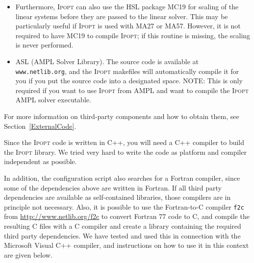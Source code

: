 \documentclass[10pt]{article}
\newcommand{\Ipopt}{\textsc{Ipopt}\xspace}
\begin{document}
\begin{itemize}
  \textbf{NOTE: The solution of the linear systems is a central
    ingredient in \Ipopt and the optimizer's performance and
    robustness depends on your choice.  The best choice depends on
    your application, and it makes sense to try different options.
    Most of the solvers also rely on efficient BLAS code (see above),
    so you should use a good BLAS library tailored to your system.
    Please keep this in mind, particularly when you are comparing
    \Ipopt with other optimization codes.}

  If you are compiling MA57, HSL\_MA77, HSL\_MA86, HSL\_MA97, or MUMPS within
  the \Ipopt build
  system, you should also include the METIS linear system ordering package.

  Interfaces to other linear solvers might be added in the future; if
  you are interested in contributing such an interface please contact
  us!  Note that \Ipopt requires that the linear solver is able to
  provide the inertia (number of positive and negative eigenvalues) of
  the symmetric matrix that is factorized.

\item Furthermore, \Ipopt can also use the HSL package MC19
  for scaling of the linear systems before they are passed to the
  linear solver.  This may be particularly useful if \Ipopt is used
  with MA27 or MA57.  However, it is not required to have MC19 to
  compile \Ipopt; if this routine is missing, the scaling is never
  performed.
\item ASL (AMPL Solver Library).  The source code is available at {\tt
    www.netlib.org}, and the \Ipopt makefiles will automatically
  compile it for you if you put the source code into a designated
  space.  NOTE: This is only required if you want to use \Ipopt from
  AMPL and want to compile the \Ipopt AMPL solver executable.
\end{itemize}
For more information on third-party components and how to obtain them,
see Section~\ref{ExternalCode}.

Since the \Ipopt code is written in C++, you will need a C++ compiler
to build the \Ipopt library.  We tried very hard to write the code as
platform and compiler independent as possible.

In addition, the configuration script also searches for a Fortran
compiler, since some of the dependencies above are written in Fortran.
If all third party dependencies are available as self-contained
libraries, those compilers are in principle not necessary.  Also, it
is possible to use the Fortran-to-C compiler {\tt f2c} from
\url{http://www.netlib.org/f2c} to convert Fortran 77 code to C, and compile the
resulting C files with a C compiler and create a library containing
the required third party dependencies.  We have tested and used this
in connection with the Microsoft Visual C++ compiler, and instructions
on how to use it in this context are given below.
\end{document}
